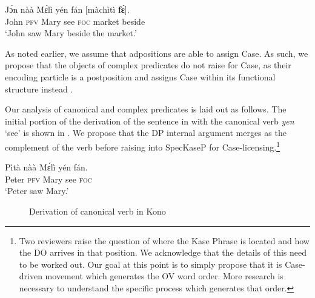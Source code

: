 \documentclass[output=paper,colorlinks,citecolor=brown,draftmode
]{langscibook}
\begin{document}
\ea \label{ex: Kono: Postpo fɛ}
\gll Jɔ́n nàà Mɛ́lì yén fán [màchìtì \textbf{fɛ́}]. \\
John \textsc{pfv} Mary see \textsc{foc} market beside\\
\glt `John saw Mary beside the market.'
\z



As noted earlier, we assume that adpositions are able to assign Case. As such, we propose that the objects of complex predicates do not raise for Case, as their encoding particle is a postposition and assigns Case within its functional structure instead \citep{stowell1981origins,mcfadden2004position,asbury2008morphosyntax}. 

Our analysis of canonical and complex predicates is laid out as follows. The initial portion of the derivation of the sentence in  with the canonical verb \textit{yen} ‘see’ is shown in . We propose that the DP internal argument merges as the complement of the verb before raising into SpecKaseP for Case-licensing.\footnote{Two reviewers raise the question of where the Kase Phrase is located and how the DO arrives in that position. We acknowledge that the details of this need to be worked out. Our goal at this point is to simply propose that it is Case-driven movement which generates the OV word order. More research is necessary to understand the specific process which generates that order. }

\ea \label{ex:Kono: Canonical for Tree}
\gll Pìtà nàà Mɛ́lì yén fán.  \\
Peter \textsc{pfv} Mary see \textsc{foc}\\
\glt `Peter saw Mary.'
\z

 \begin{figure}
 \caption{Derivation of canonical verb in Kono}
    \label{fig:Derivation of Canonical Verb in Kono} 
 \vspace{-12mm}
 \end{figure}
\end{document}

